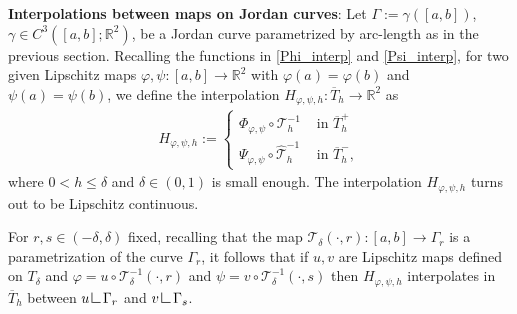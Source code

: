 \documentclass[a4paper,11pt]{article}
\numberwithin{equation}{section}
\newcommand{\R}{\mathbb{R}}
\newcommand{\res}      {\mathop{\hbox{\vrule height 7pt width .5pt depth
                        0pt\vrule height .5pt width 6pt depth 0pt}}\nolimits}
\begin{document}
\textbf{Interpolations between maps on Jordan curves}:
Let $\Gamma:=\gamma([a,b])$, $\gamma\in C^3([a,b];\R^2)$, be a Jordan curve parametrized by arc-length as in the previous section.
Recalling the functions in \eqref{Phi_interp} and \eqref{Psi_interp}, for two given Lipschitz maps $\varphi,\psi:[a,b]\rightarrow \R^2$ with $\varphi(a)=\varphi(b)$ and $\psi(a)=\psi(b)$, we define the interpolation $H_{\varphi,\psi,h}:\overline T_{h}\rightarrow \R^2$ as
\begin{align}\label{Hinterp}
H_{\varphi,\psi,h}:=\begin{cases}
				 \Phi_{\varphi,\psi}\circ \mathcal T_h^{-1}&\text{ in }\overline T_h^+\\
			 \Psi_{\varphi,\psi}\circ \widehat {\mathcal T}_h^{-1}&\text{ in }\overline T_h^-,
					\end{cases}
\end{align}
where $0<h\leq \delta$ and $\delta\in (0,1)$ is small enough.
The interpolation $H_{\varphi,\psi,h}$ turns out to be Lipschitz continuous.

For $r,s\in (-\delta,\delta)$ fixed, recalling that the map $\mathcal T_\delta(\cdot,r):[a,b]\rightarrow \Gamma_r$ is a parametrization of the curve $\Gamma_r$, it follows that if $u,v$ are Lipschitz maps defined on $T_\delta$ and  $\varphi=u\circ \mathcal T_\delta^{-1}(\cdot,r)$ and $\psi=v\circ \mathcal T_\delta^{-1}(\cdot,s)$ then  $H_{\varphi,\psi,h}$ interpolates in $\overline T_h$ between $u\res\Gamma_r $ and $v\res \Gamma_s$. 
\end{document}

